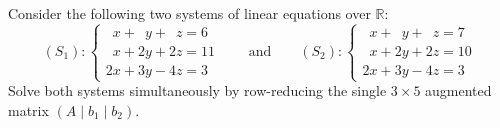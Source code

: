 \begin{exercise}
\label{exc:simultaneous_row_reduction}
Consider the following two systems of linear equations over $\mathbb{R}$:
\[
(S_1): \begin{cases}
\phantom{2}x + \phantom{2}y + \phantom{2}z = 6 \\
\phantom{2}x + 2y + 2z = 11 \\
2x + 3y - 4z = 3
\end{cases}
\qquad\text{and}\qquad
(S_2): \begin{cases}
\phantom{2}x + \phantom{2}y + \phantom{2}z = 7 \\
\phantom{2}x + 2y + 2z = 10 \\
2x + 3y - 4z = 3
\end{cases}
\]
Solve both systems simultaneously by row-reducing the single $3 \times 5$ augmented matrix $(A \mid b_1 \mid b_2)$.
\end{exercise}

